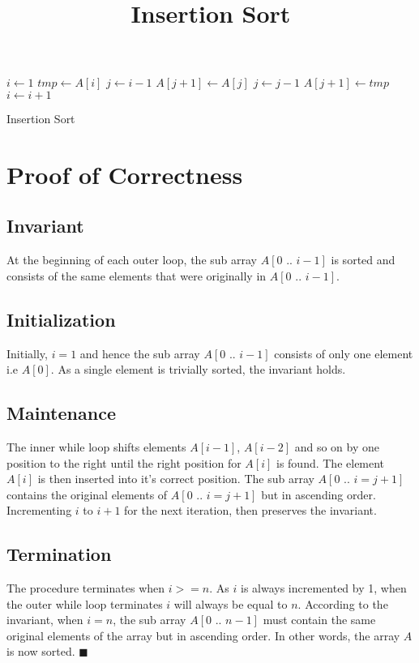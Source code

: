 \documentclass[10pt,a4paper]{article}
\title{Insertion Sort}
\date{}
\begin{document}
\maketitle

\begin{algorithm}[H]
 $i \leftarrow 1$\; 
  {
  $tmp \leftarrow A[i]$\;
  $j \leftarrow i-1$\;
  	 {
  		$A[j+1] \leftarrow A[j]$\;
  		$j \leftarrow j - 1$\;
  	}
  	$A[j+1] \leftarrow tmp$\;
  	$i \leftarrow i + 1$\;
 }
 \caption{Insertion Sort}
\end{algorithm}

\section{Proof of Correctness}
\subsection{Invariant}
At the beginning of each outer loop, the sub array $A[0 \text{ .. } i-1]$ is sorted 
and consists of the same elements that were originally in $A[0 \text{ .. } i-1]$.

\subsection{Initialization}
Initially, $i = 1$ and hence the sub array $A[0 \text{ .. } i-1]$ consists of only one 
element i.e $A[0]$. As a single element is trivially sorted, the invariant holds.

\subsection{Maintenance}
The inner while loop shifts elements $A[i-1]$, $A[i-2]$ and so on by one position to
the right until the right position for $A[i]$ is found. The element $A[i]$ is then 
inserted into it's correct position. The sub array $A[0 \text{ .. } i = j+1]$ contains 
the original elements of $A[0 \text{ .. } i = j+1]$  but in ascending order. Incrementing $i$
to $i + 1$ for the next iteration, then preserves the invariant.

\subsection{Termination}
The procedure terminates when $ i >= n$. As $i$ is always incremented by 1, when the
outer while loop terminates $i$ will always be equal to $n$. According to the invariant, when $i = n$,
the sub array $A[0 \text{ .. } n-1]$ must contain the same original elements of the array
but in ascending order. In other words, the array $A$ is now sorted. $\blacksquare$

	
\end{document}

